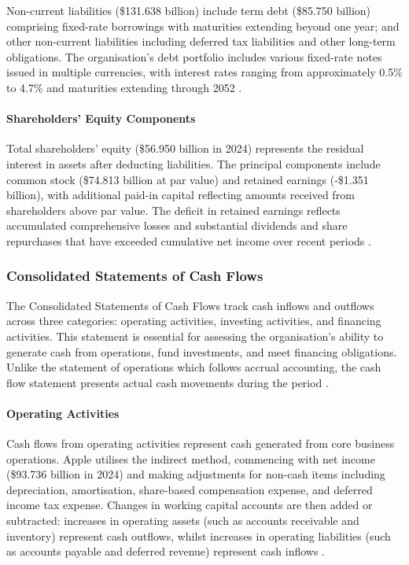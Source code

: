 \documentclass[12pt,a4paper]{article}
\begin{document}
Non-current liabilities (\$131.638 billion) include term debt (\$85.750 billion) comprising fixed-rate borrowings with maturities extending beyond one year; and other non-current liabilities including deferred tax liabilities and other long-term obligations. The organisation's debt portfolio includes various fixed-rate notes issued in multiple currencies, with interest rates ranging from approximately 0.5\% to 4.7\% and maturities extending through 2052 \citep{apple202410k}.

\paragraph{Shareholders' Equity Components}

Total shareholders' equity (\$56.950 billion in 2024) represents the residual interest in assets after deducting liabilities. The principal components include common stock (\$74.813 billion at par value) and retained earnings (-\$1.351 billion), with additional paid-in capital reflecting amounts received from shareholders above par value. The deficit in retained earnings reflects accumulated comprehensive losses and substantial dividends and share repurchases that have exceeded cumulative net income over recent periods \citep{apple202410k}.

\subsubsection{Consolidated Statements of Cash Flows}

The Consolidated Statements of Cash Flows track cash inflows and outflows across three categories: operating activities, investing activities, and financing activities. This statement is essential for assessing the organisation's ability to generate cash from operations, fund investments, and meet financing obligations. Unlike the statement of operations which follows accrual accounting, the cash flow statement presents actual cash movements during the period \citep{kieso2023}.

\paragraph{Operating Activities}

Cash flows from operating activities represent cash generated from core business operations. Apple utilises the indirect method, commencing with net income (\$93.736 billion in 2024) and making adjustments for non-cash items including depreciation, amortisation, share-based compensation expense, and deferred income tax expense. Changes in working capital accounts are then added or subtracted: increases in operating assets (such as accounts receivable and inventory) represent cash outflows, whilst increases in operating liabilities (such as accounts payable and deferred revenue) represent cash inflows \citep{apple202410k}.
\end{document}
